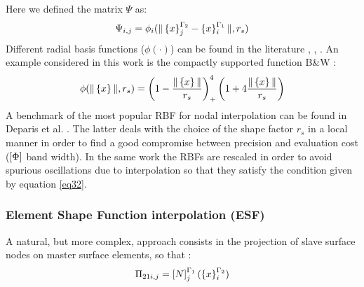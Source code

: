      Here we defined the matrix $\Psi$ as:
     \begin{equation}
     \label{eq.40}
       \Psi_ {i,j}=\phi_i(\|\left\lbrace{x}\right \rbrace^{\Gamma_2}_j-\left\lbrace{x}\right \rbrace^{\Gamma_1}_i\|,r_s)
     \end{equation}
     Different radial basis functions ($\phi(\cdot)$) can be found in the literature  \cite{wendland1995piecewise},\cite{buhmann2003radial} , \cite{duchon1977splines}.  An example considered in this work is the compactly supported function B\&W \cite{wendland1995piecewise}:
     \begin{equation}
     \label{eq.41}
     \phi(\|\left\lbrace{x}\right \rbrace\|,r_s)=\left(1-\frac{\|\left\lbrace{x}\right \rbrace\|}{r_s}\right)^4_+\left(1+4\frac{\|\left\lbrace{x}\right \rbrace\|}{r_s}\right)
     \end{equation}
     A benchmark of the most popular RBF for nodal interpolation can be found in Deparis et al. \cite{deparis2014rescaled}. The latter deals with the choice of the shape factor $r_s$ in a local manner in order to find a good compromise between precision and evaluation cost ($\left[{\Phi}\right]$ band width). In the same work the RBFs are rescaled in order to avoid spurious oscillations due to interpolation so that they satisfy the condition given by equation \eqref{eq32}. 
     \subsubsection{Element Shape Function interpolation (ESF)}\label{sssec333}
     A natural, but more complex, approach consists in the projection of slave surface nodes on master surface  elements, so that :
     \begin{equation}
     \label{eq.42}
         \Pi_{21i,j}=\left[{N}\right]_{j}^{\Gamma_1}(\left\lbrace{x}\right \rbrace_i^{\Gamma_2})
     \end{equation}
     
